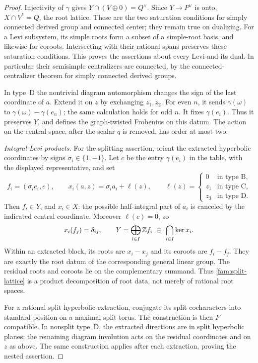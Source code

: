 \begin{proof}
Injectivity of \(\gamma\) gives
\(Y\cap(V\oplus0)=Q^\vee\).  Since \(Y\to P^\vee\) is onto,
\(X\cap V^*=Q\), the root lattice.  These are the two saturation
conditions for simply connected derived group and connected center;
they remain true on dualizing.  For a Levi subsystem, its simple
roots form a subset of a simple-root basis, and likewise for
coroots.  Intersecting with their rational spans preserves these
saturation conditions.  This proves the assertions about every
Levi and its dual.  In particular their semisimple centralizers are
connected, by the connected-centralizer theorem for simply connected
derived groups.

In type~D the nontrivial diagram automorphism changes the sign of
the last coordinate of \(a\).  Extend it on \(z\) by exchanging
\(z_1,z_2\).  For even \(n\), it sends
\(\gamma(\omega)\) to \(\gamma(\omega)-\gamma(e_n)\);
the same calculation holds for odd \(n\).  It fixes
\(\gamma(e_i)\).  Thus it preserves \(Y\), and defines the
graph-twisted Frobenius on this datum.  The action on the central
space, after the scalar \(q\) is removed, has order at most two.

\smallskip\noindent\emph{Integral Levi products.}
For the splitting assertion, orient the extracted hyperbolic
coordinates by signs \(\sigma_i\in\{1,-1\}\).  Let \(c\) be the
entry \(\gamma(e_i)\) in the table, with the displayed representative,
and set
\[
 f_i=(\sigma_i e_i,c),\qquad
 x_i(a,z)=\sigma_i a_i+\ell(z),\qquad
 \ell(z)=
 \begin{cases}
  0&\text{in type B},\\
  z_1&\text{in type C},\\
  z_3&\text{in type D}.
 \end{cases}
\]
Then \(f_i\in Y\), and \(x_i\in X\): the possible half-integral
part of \(a_i\) is canceled by the indicated central coordinate.
Moreover \(\ell(c)=0\), so
\begin{equation}\label{fam:split-lattice}
 x_i(f_j)=\delta_{ij},\qquad
 Y=\bigoplus_{i\in I}\mathbb Z f_i\ \oplus\
               \bigcap_{i\in I}\ker x_i.
\end{equation}
Within an extracted block, its roots are \(x_i-x_j\) and its
coroots are \(f_i-f_j\).  They are exactly the root datum of the
corresponding general linear group.  The residual roots and
coroots lie on the complementary summand.  Thus
\eqref{fam:split-lattice} is a product decomposition of root data,
not merely of rational root spaces.

For a rational split hyperbolic extraction, conjugate its split
cocharacters into standard position on a maximal split torus.
The construction is then \(F\)-compatible.  In nonsplit type~D,
the extracted directions are in split hyperbolic planes; the
remaining diagram involution acts on the residual coordinates and
on \(z\) as above.  The same construction applies after each
extraction, proving the nested assertion.


\end{proof}
